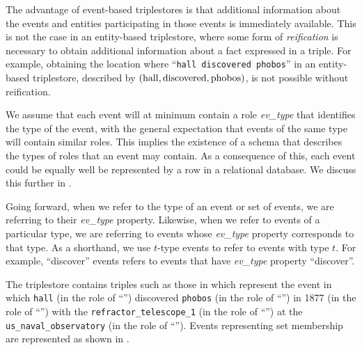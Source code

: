 \documentclass[../main.tex]{subfiles}
\begin{document}
\begin{refsection}
The advantage of event-based triplestores is that additional information about the events and entities participating in those events is immediately available. This is not the case in an entity-based triplestore, where some form of \textit{reification} is necessary to obtain additional information about a fact expressed in a triple.  For example, obtaining the location where ``\texttt{hall discovered phobos}'' in an entity-based triplestore, described by $(\operatorname{hall}, \operatorname{discovered}, \operatorname{phobos})$, is not possible without reification.

We assume that each event will at minimum contain a role \textit{ev\_type} that identifies the type of the event, with the general expectation that events of the same type will contain similar roles.
This implies the existence of a schema that describes the types of roles that an event may contain.  As a consequence of this, each event could be equally well be represented by a row in a relational database.  We discuss this further in .

Going forward, when we refer to the type of an event or set of events, we are referring to their \textit{ev\_type} property.  Likewise, when we refer to events of a particular type, we are referring to events whose \textit{ev\_type} property corresponds to that type.  As a shorthand, we use $t$-type events to refer to events with type $t$.  For example, ``discover'' events refers to events that have \textit{ev\_type} property ``discover''.

The triplestore contains triples such as those in  which represent the event in which \texttt{hall} (in the role of ``'') discovered \texttt{phobos} (in the role of ``'') in 1877 (in the role of ``'') with the \texttt{refractor\_telescope\_1} (in the role of ``'')  at the \texttt{us\_naval\_observatory} (in the role of ``'').  Events representing set membership are represented as shown in .


\end{refsection}
\end{document}
